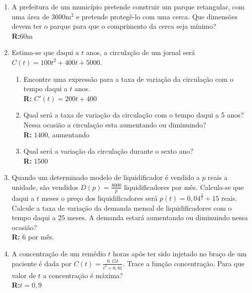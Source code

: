 \documentclass[oneside,a4paper,12pt]{article}
\begin{document}
\begin{enumerate}
	\item A prefeitura de um município pretende construir um parque retangular, com uma área de $3600$m$^2$ e pretende protegê-lo com uma cerca. Que dimensões devem ter o parque para que o comprimento da cerca seja mínimo? \\ {\bf R:}$60$m
	
	\item Estima-se que daqui a $t$ anos, a circulação de um jornal será $C(t) = 100t^2 + 400t + 5000$.
	\begin{enumerate}
		\item Encontre uma expressão para a taxa de variação da circulação com o tempo daqui a $t$ anos. \\ {\bf R:} $C'(t) = 200t + 400$
		\item Qual será a taxa de variação da circulação com o tempo daqui a 5 anos? Nessa ocasião a circulação esta aumentando ou diminuindo? \\ {\bf R:} $1400$, aumentando
		\item Qual será a variação da circulação durante o sexto ano? \\ {\bf R:} $1500$
	\end{enumerate}

	\item Quando um determinado modelo de liquidificador é vendido a $p$ reais a unidade, são vendidos $D(p) = \frac{8000}{p}$ liquidificadores por mês. Calcula-se que daqui a $t$ meses o preço dos liquidificadores será $p(t) = 0,04^{\frac{3}{2}}+15$ reais. Calcule a taxa de variação da demanda mensal de liquidificadores com o tempo daqui a $25$ meses. A demanda estará aumentando ou diminuindo nessa ocasião? \\ {\bf R:} $6$ por mês.
	
	\item A concentração de um remédio $t$ horas após ter sido injetado no braço de um paciente é dada por $C(t) = \frac{0,15t}{t^2+0,81}$. Trace a função concentração. Para que valor de $t$ a concentração é máxima? \\ {\bf R:}$t = 0,9$
	

\end{enumerate}
\end{document}
